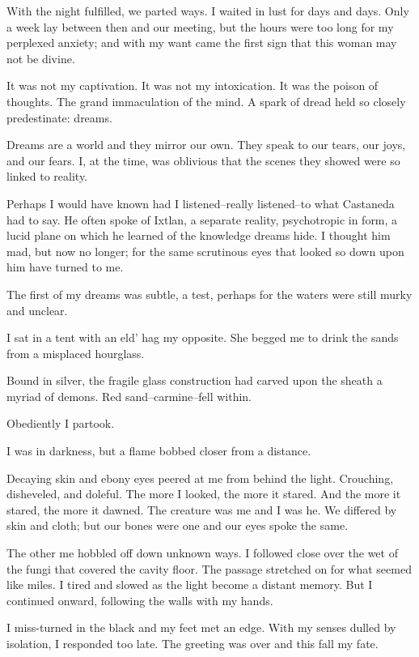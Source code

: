 \documentclass{article}
\begin{document}
With the night fulfilled, we parted ways.
I waited in lust for days and days.
Only a week lay between then and our meeting,
but the hours were too long for my perplexed anxiety;
and with my want came the first sign that this woman may not be divine.


It was not my captivation.
It was not my intoxication.
It was the poison of thoughts.
The grand immaculation of the mind.
A spark of dread held so closely predestinate: dreams.
\VV


\noindent
Dreams are a world and they mirror our own.
They speak to our tears, our joys, and our fears.
I, at the time, was oblivious that the scenes they
showed were so linked to reality.


Perhaps I would have known had I listened--really listened--to
what Castaneda had to say.
He often spoke of Ixtlan,
a separate reality,
psychotropic in form,
a lucid plane on which he learned of the knowledge dreams hide.
I thought him mad, but now no longer;
for the same scrutinous eyes that looked so down upon him
have turned to me.
\VV


\noindent
The first of my dreams was subtle, a test, perhaps
for the waters were still murky and unclear.
\vvvv


\noindent
I sat in a tent with an eld' hag my opposite.
She begged me to drink the sands from a misplaced hourglass.


Bound in silver, the fragile glass construction had
carved upon the sheath a myriad of demons.
Red sand--carmine--fell within.


Obediently I partook.


\noindent
I was in darkness, but a flame bobbed closer from a distance.


Decaying skin and ebony eyes peered at me from behind the light.
Crouching, disheveled, and doleful.
The more I looked, the more it stared.
And the more it stared, the more it dawned.
The creature was me and I was he.
We differed by skin and cloth; but our bones were one
and our eyes spoke the same.


The other me hobbled off down unknown ways.
I followed close over the wet of the fungi that
covered the cavity floor.
The passage stretched on for what seemed like miles.
I tired and slowed as the light become a distant memory.
But I continued onward, following the walls with my hands.


I miss-turned in the black and my feet met an edge.
With my senses dulled by isolation, I responded too late.
The greeting was over and this fall my fate.
\vvvv
\end{document}
